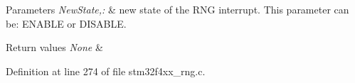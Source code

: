 \begin{DoxyParams}{Parameters}
{\em New\-State,\-:} & new state of the R\-N\-G interrupt. This parameter can be\-: E\-N\-A\-B\-L\-E or D\-I\-S\-A\-B\-L\-E. \\
\hline
\end{DoxyParams}

\begin{DoxyRetVals}{Return values}
{\em None} & \\
\hline
\end{DoxyRetVals}


Definition at line 274 of file stm32f4xx\-\_\-rng.\-c.

